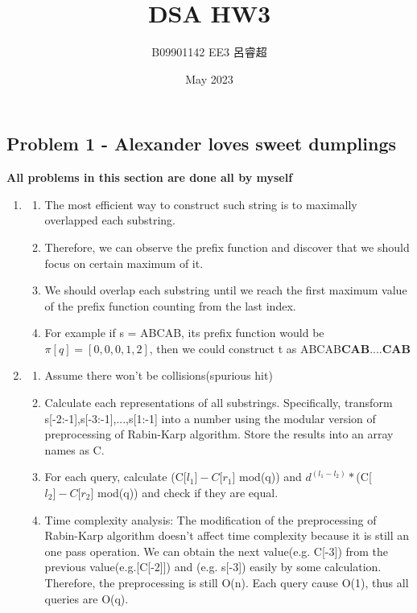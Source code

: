 \documentclass{article}
\title{DSA HW3}
\author{B09901142 EE3 呂睿超}
\date{May 2023}
\begin{document}
\begin{CJK*}{UTF8}{bsmi}
\maketitle

\section{Problem 1 - Alexander loves sweet dumplings}
\textbf{All problems in this section are done all by myself}

\begin{enumerate}
    \item \begin{enumerate}
        \item The most efficient way to construct such string is to maximally overlapped each substring.
        \item Therefore, we can observe the prefix function and discover that we should focus on certain maximum of it.
        \item We should overlap each substring until we reach the first maximum value of the prefix function counting from the last index.
        \item For example if s = ABCAB, its prefix function would be $\pi[q] = [0,0,0,1,2]$, then we could construct t as ABCAB\textbf{CAB}....\textbf{CAB}
    \end{enumerate}
    \item \begin{enumerate}
        \item Assume there won't be collisions(spurious hit) 
        \item Calculate each representations of all substrings. Specifically, transform s[-2:-1],s[-3:-1],...,s[1:-1] into a number using the modular version of preprocessing of Rabin-Karp algorithm. Store the results into an array names as C.
        \item For each query, calculate (C[$l_1] - C[r_1$] mod(q)) and $d^{(l_1-l_2)}*$(C[$l_2] - C[r_2$] mod(q)) and check if they are equal. 
        \item Time complexity analysis: The modification of the preprocessing of Rabin-Karp algorithm doesn't affect time complexity because it is still an one pass operation. We can obtain the next value(e.g. C[-3]) from the previous value(e.g.[C[-2]]) and (e.g. s[-3]) easily by some calculation.
        Therefore, the preprocessing is still O(n). Each query cause O(1), thus all queries are O(q). 

\end{enumerate}
\end{enumerate}
\end{CJK*}
\end{document}
